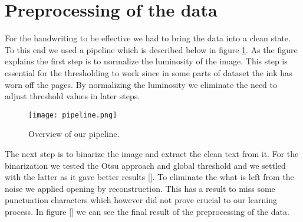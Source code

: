 
\section{Preprocessing of the data}
\label{sec:prepro}
For the handwriting to be effective we had to bring the data into a clean state. To this end we used a pipeline which is described below in figure \ref{fig:pipeline}. As the figure explains the first step is to normalize the luminosity of the image. This step is essential for the thresholding to work since in some parts of dataset the ink has worn off the pages. By normalizing the luminosity we eliminate the need to adjust threshold values in later steps.

\begin{figure}[h]
\label{fig:pipeline}
\texttt{[image: pipeline.png]}
\caption{Overview of our pipeline.}
\end{figure}

The next step is to binarize the image and extract the clean text from it. For the binarization we tested the Otsu approach and global threshold and we settled with the latter as it gave better results \ref{}. To eliminate the what is left from the noise we applied opening by reconstruction. This has a result to miss some punctuation characters which however did not prove crucial to our learning process. In figure \ref{} we can see the final result of the preprocessing of the data. 
